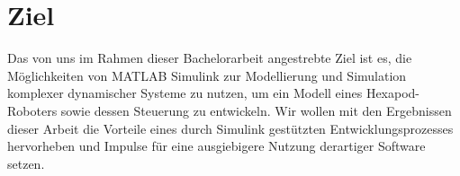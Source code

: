 

\section{Ziel}
Das von uns im Rahmen dieser Bachelorarbeit angestrebte Ziel ist es, die Möglichkeiten von MATLAB Simulink zur Modellierung und Simulation komplexer dynamischer Systeme zu nutzen, um ein Modell eines Hexapod-Roboters sowie dessen Steuerung zu entwickeln.
Wir wollen mit den Ergebnissen dieser Arbeit die Vorteile eines durch Simulink gestützten Entwicklungsprozesses hervorheben und Impulse für eine ausgiebigere Nutzung derartiger Software setzen.

